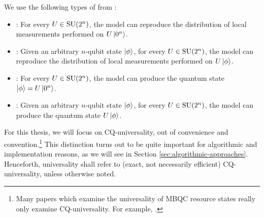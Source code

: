 \begin{definition}
\label{def:types-of-universal}
We use the following types of  from \cite{MBQC-universal}:
\begin{itemize}
    \item {}: For every $U \in \operatorname{SU}(2^n)$, the model can reproduce the distribution of local measurements performed on $U \ket{0^n}$.
    \item {}: Given an arbitrary $n$-qubit state $\ket\phi$, for every $U \in \operatorname{SU}(2^n)$, the model can reproduce the distribution of local measurements performed on $U \ket\phi$.
    \item {}: For every $U \in \operatorname{SU}(2^n)$, the model can produce the quantum state $\ket\phi = U\ket{0^n}$.
    \item {}: Given an arbitrary $n$-qubit state $\ket\phi$, for every $U \in \operatorname{SU}(2^n)$, the model can produce the quantum state $U \ket\phi$.
\end{itemize}
\end{definition}

For this thesis, we will focus on CQ-universality, out of convenience and convention.\footnote{Many papers which examine the universality of MBQC resource states really only examine CQ-universality. For example, \cite{MBQC-universal}.} This distinction turns out to be quite important for algorithmic and implementation reasons, as we will see in Section \ref{sec:algorithmic-approaches}. Henceforth, universality shall refer to (exact, not necessarily efficient) CQ-universality, unless otherwise noted.